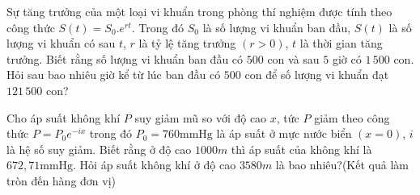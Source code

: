 \begin{ex}%
	Sự tăng trưởng của một loại vi khuẩn trong phòng thí nghiệm được tính theo công thức $S(t)=S_0.e^{rt}$. Trong đó $S_0$ là số lượng vi khuẩn ban đầu,  $S(t)$ là số lượng vi khuẩn có sau $t$, $r$ là tỷ lệ tăng trưởng $(r > 0)$, $t$ là thời gian tăng trưởng. Biết rằng số lượng vi khuẩn ban đầu có $500$ con và sau $5$ giờ có $1\,500$ con. Hỏi sau bao nhiêu giờ kể từ lúc ban đầu có $500$ con để số lượng vi khuẩn đạt $121\,500$ con?
\end{ex}

\begin{ex}%
	Cho áp suất không khí $P$ suy giảm mũ so với độ cao $x$, tức $P$ giảm theo công thức $P=P_0 e^{-ix}$ trong đó $P_0=760 \text{mmHg}$ là áp suất ở mực nước biển $(x=0)$, $i$ là hệ số suy giảm. Biết rằng ở độ cao $1000 m$ thì áp suất của không khí là $672{,}71 \text{mmHg}$. Hỏi áp suất không khí ở độ cao $3580 m$ là bao nhiêu?(Kết quả  làm tròn đến hàng đơn vị)
\end{ex}

